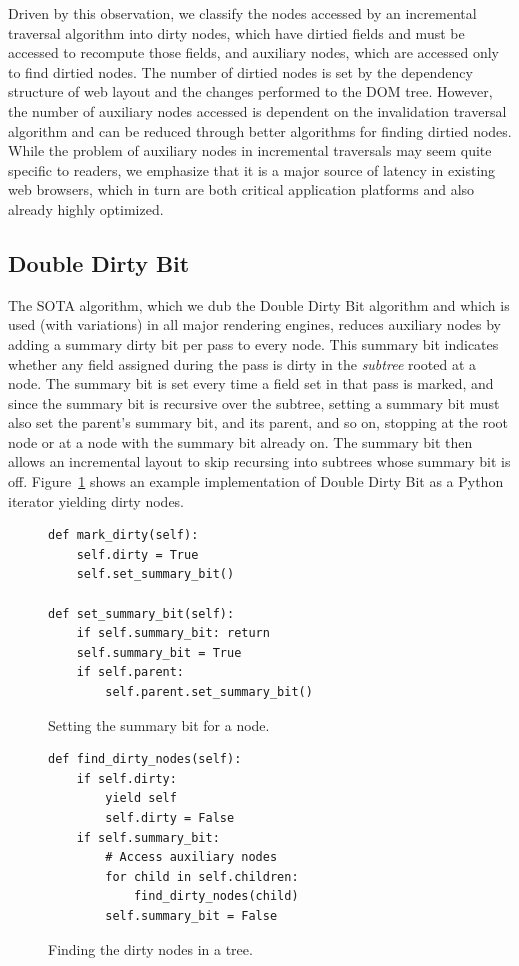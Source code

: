 Driven by this observation, we classify the nodes
  accessed by an incremental traversal algorithm
  into dirty nodes, which have dirtied fields
  and must be accessed to recompute those fields,
  and auxiliary nodes,
  which are accessed only to find dirtied nodes.
The number of dirtied nodes is set by
  the dependency structure of web layout
  and the changes performed to the DOM tree.
However, the number of auxiliary nodes accessed
  is dependent on the invalidation traversal algorithm
  and can be reduced through better algorithms for finding dirtied nodes.
While the problem of auxiliary nodes
  in incremental traversals may seem quite specific to readers,
  we emphasize that it is
  a major source of latency in existing web browsers,
  which in turn are both critical application platforms
  and also already highly optimized.

\subsection{Double Dirty Bit}
The SOTA algorithm,
  which we dub the Double Dirty Bit algorithm
  and which is used (with variations) in all major rendering engines,
  reduces auxiliary nodes by adding a summary dirty bit per pass
  to every node.
This summary bit indicates whether any field assigned during the pass
  is dirty in the \emph{subtree} rooted at a node.
The summary bit is set every time a field set in that pass is marked,
  and since the summary bit is recursive over the subtree,
  setting a summary bit must also set the parent's summary bit,
  and its parent, and so on, stopping at the root node
  or at a node with the summary bit already on.
The summary bit then allows an incremental layout
  to skip recursing into subtrees
  whose summary bit is off.
Figure~\ref{fig:find-dirty-nodes} shows an example implementation
  of Double Dirty Bit
  as a Python iterator yielding dirty nodes.

\begin{figure}
\begin{minipage}[b]{0.5\linewidth}
\begin{verbatim}
def mark_dirty(self):
    self.dirty = True
    self.set_summary_bit()

def set_summary_bit(self):
    if self.summary_bit: return
    self.summary_bit = True
    if self.parent:
        self.parent.set_summary_bit()
\end{verbatim}
\caption{Setting the summary bit for a node.}
\label{fig:set-summary-bits}
\end{minipage}\hfill%
\begin{minipage}[b]{0.5\linewidth}
\begin{verbatim}
def find_dirty_nodes(self):
    if self.dirty:
        yield self
        self.dirty = False
    if self.summary_bit:
        # Access auxiliary nodes
        for child in self.children:
            find_dirty_nodes(child)
        self.summary_bit = False
\end{verbatim}
\caption{Finding the dirty nodes in a tree.}
\label{fig:find-dirty-nodes}
\end{minipage}
\end{figure}

